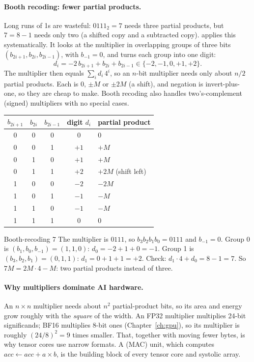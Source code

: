 \paragraph{Booth recoding: fewer partial products.} Long runs of 1s are wasteful: $0111_2 = 7$ needs three partial products, but $7 = 8 - 1$ needs only two (a shifted copy and a subtracted copy).  applies this systematically. It looks at the multiplier in overlapping groups of three bits $(b_{2i+1}, b_{2i}, b_{2i-1})$, with $b_{-1} = 0$, and turns each group into one digit:
\[
  d_i = -2\,b_{2i+1} + b_{2i} + b_{2i-1} \in \{-2, -1, 0, +1, +2\}.
\]
The multiplier then equals $\sum_i d_i \, 4^i$, so an $n$-bit multiplier needs only about $n/2$ partial products. Each is $0$, $\pm M$ or $\pm 2M$ (a shift), and negation is invert-plus-one, so they are cheap to make. Booth recoding also handles two's-complement (signed) multipliers with no special cases.

\begin{center}
\begin{tabular}{ccc|c|l}
\toprule
$b_{2i+1}$ & $b_{2i}$ & $b_{2i-1}$ & digit $d_i$ & partial product \\
\midrule
0 & 0 & 0 & $0$ & 0 \\
0 & 0 & 1 & $+1$ & $+M$ \\
0 & 1 & 0 & $+1$ & $+M$ \\
0 & 1 & 1 & $+2$ & $+2M$ (shift left) \\
1 & 0 & 0 & $-2$ & $-2M$ \\
1 & 0 & 1 & $-1$ & $-M$ \\
1 & 1 & 0 & $-1$ & $-M$ \\
1 & 1 & 1 & $0$ & 0 \\
\bottomrule
\end{tabular}
\end{center}

\begin{worked}{Booth-recoding 7}
The multiplier is $0111$, so $b_3 b_2 b_1 b_0 = 0111$ and $b_{-1} = 0$.
Group 0 is $(b_1, b_0, b_{-1}) = (1, 1, 0)$: $d_0 = -2 + 1 + 0 = -1$.
Group 1 is $(b_3, b_2, b_1) = (0, 1, 1)$: $d_1 = 0 + 1 + 1 = +2$.
Check: $d_1 \cdot 4 + d_0 = 8 - 1 = 7$. So $7M = 2M \cdot 4 - M$: two partial products instead of three.
\end{worked}

\paragraph{Why multipliers dominate AI hardware.} An $n \times n$ multiplier needs about $n^2$ partial-product bits, so its area and energy grow roughly with the \emph{square} of the width. An FP32 multiplier multiplies 24-bit significands; BF16 multiplies 8-bit ones (Chapter~\ref{ch:gpu}), so its multiplier is roughly $(24/8)^2 = 9$ times smaller. That, together with moving fewer bytes, is why tensor cores use narrow formats. A  (MAC) unit, which computes $acc \leftarrow acc + a \times b$, is the building block of every tensor core and systolic array.

